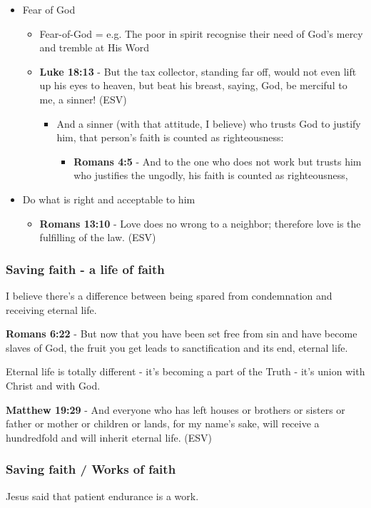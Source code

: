 \documentclass[11pt]{article}
\begin{document}
\begin{itemize}
\item Fear of God
\begin{itemize}
\item Fear-of-God = e.g. The poor in spirit recognise their need of God's mercy and tremble at His Word
\item \textbf{Luke 18:13} - But the tax collector, standing far off, would not even lift up his eyes to heaven, but beat his breast, saying, God, be merciful to me, a sinner! (ESV)
\begin{itemize}
\item And a sinner (with that attitude, I believe) who trusts God to justify him, that person's faith is counted as righteousness:
\begin{itemize}
\item \textbf{Romans 4:5} - And to the one who does not work but trusts him who justifies the ungodly, his faith is counted as righteousness,
\end{itemize}
\end{itemize}
\end{itemize}
\item Do what is right and acceptable to him
\begin{itemize}
\item \textbf{Romans 13:10} - Love does no wrong to a neighbor; therefore love is the fulfilling of the law. (ESV)
\end{itemize}
\end{itemize}

\subsubsection{Saving faith - a life of faith}
\label{sec:org85ebbaa}
I believe there's a difference between being spared from condemnation and receiving eternal life.

\textbf{Romans 6:22} - But now that you have been set free from sin and have become slaves of God, the fruit you get leads to sanctification and its end, eternal life.

Eternal life is totally different - it's becoming a part of the Truth - it's union with Christ and with God.

\textbf{Matthew 19:29} - And everyone who has left houses or brothers or sisters or father or mother or children or lands, for my name's sake, will receive a hundredfold and will inherit eternal life. (ESV)

\subsubsection{Saving faith / Works of faith}
\label{sec:orgd2d717f}
Jesus said that patient endurance is a work.
\end{document}
